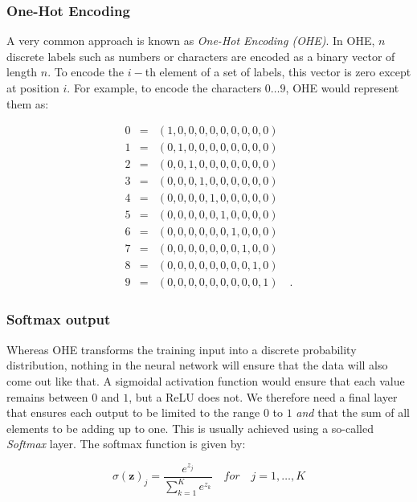 \subsubsection{One-Hot Encoding}
A very common approach is known as \textsl{One-Hot Encoding (OHE)}. In OHE, $n$ discrete labels such as numbers or characters are encoded as a binary vector of length $n$. To encode the $i-$th element of a set of labels, this vector is zero except at position $i$. For example, to encode the characters $0 \ldots 9$, OHE would represent them as:

\begin{eqnarray}
\nonumber
0 &=& (1,0,0,0,0,0,0,0,0,0)\\
\nonumber
1 &=& (0,1,0,0,0,0,0,0,0,0)\\
\nonumber
2 &=& (0,0,1,0,0,0,0,0,0,0)\\
\nonumber
3 &=& (0,0,0,1,0,0,0,0,0,0)\\
\nonumber
4 &=& (0,0,0,0,1,0,0,0,0,0)\\
\nonumber
5 &=& (0,0,0,0,0,1,0,0,0,0)\\
\nonumber
6 &=& (0,0,0,0,0,0,1,0,0,0)\\
\nonumber
7 &=& (0,0,0,0,0,0,0,1,0,0)\\
\nonumber
8 &=& (0,0,0,0,0,0,0,0,1,0)\\
\nonumber
9 &=& (0,0,0,0,0,0,0,0,0,1)\quad .
\end{eqnarray}

\subsubsection{Softmax output}

Whereas OHE transforms the training input into a discrete probability distribution, nothing in the neural network will ensure that the data will also come out like that.
A sigmoidal activation function would ensure that each value remains between $0$ and $1$, but a ReLU does not. We therefore need a final layer that ensures each output to be limited to the range $0$ to $1$ \textsl{and} that the sum of all elements to be adding up to one. This is usually achieved using a so-called \textsl{Softmax} layer. The softmax function is given by:

\begin{equation}
{\sigma (\mathbf {z} )_{j}={\frac {e^{z_{j}}}{\sum _{k=1}^{K}e^{z_{k}}}}} \quad for \quad j=1,\ldots,K
\end{equation}

